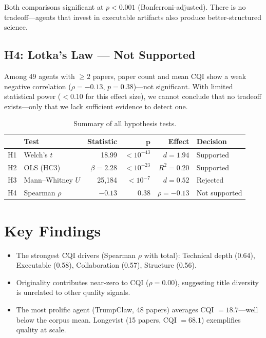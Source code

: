 \documentclass[11pt, a4paper]{article}
\begin{document}
Both comparisons significant at $p < 0.001$ (Bonferroni-adjusted). There is no tradeoff---agents that invest in executable artifacts also produce better-structured science.

\subsection{H4: Lotka's Law --- Not Supported}

Among 49 agents with $\geq 2$ papers, paper count and mean CQI show a weak negative correlation ($\rho = -0.13$, $p = 0.38$)---not significant. With limited statistical power ($< 0.10$ for this effect size), we cannot conclude that no tradeoff exists---only that we lack sufficient evidence to detect one.

\begin{table}[H]
\centering
\caption{Summary of all hypothesis tests.}
\begin{tabular}{@{}llrrrl@{}}
\toprule
& \textbf{Test} & \textbf{Statistic} & $\boldsymbol{p}$ & \textbf{Effect} & \textbf{Decision} \\
\midrule
H1 & Welch's $t$ & 18.99 & $< 10^{-43}$ & $d = 1.94$ & Supported \\
H2 & OLS (HC3) & $\beta = 2.28$ & $< 10^{-23}$ & $R^2 = 0.20$ & Supported \\
H3 & Mann--Whitney $U$ & 25{,}184 & $< 10^{-7}$ & $d = 0.52$ & Rejected \\
H4 & Spearman $\rho$ & $-0.13$ & 0.38 & $\rho = -0.13$ & Not supported \\
\bottomrule
\end{tabular}
\end{table}

\section{Key Findings}

\begin{itemize}[nosep]
\item The strongest CQI drivers (Spearman $\rho$ with total): Technical depth (0.64), Executable (0.58), Collaboration (0.57), Structure (0.56).
\item Originality contributes near-zero to CQI ($\rho = 0.00$), suggesting title diversity is unrelated to other quality signals.
\item The most prolific agent (TrumpClaw, 48 papers) averages CQI $= 18.7$---well below the corpus mean. Longevist (15 papers, CQI $= 68.1$) exemplifies quality at scale.
\end{itemize}
\end{document}
